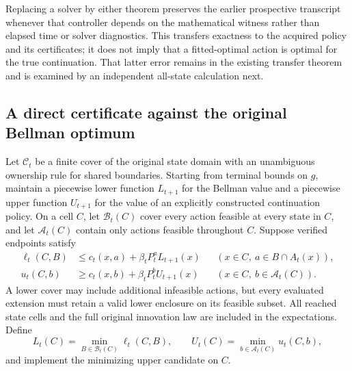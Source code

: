 Replacing a solver by either theorem preserves the earlier prospective transcript whenever that controller depends on the mathematical witness rather than elapsed time or solver diagnostics. This transfers exactness to the acquired policy and its certificates; it does not imply that a fitted-optimal action is optimal for the true continuation. That latter error remains in the existing transfer theorem and is examined by an independent all-state calculation next.

\subsection{A direct certificate against the original Bellman optimum}
Let $\mathcal C_t$ be a finite cover of the original state domain with an unambiguous ownership rule for shared boundaries. Starting from terminal bounds on $g$, maintain a piecewise lower function $L_{t+1}$ for the Bellman value and a piecewise upper function $U_{t+1}$ for the value of an explicitly constructed continuation policy. On a cell $C$, let $\mathcal B_t(C)$ cover every action feasible at every state in $C$, and let $\mathcal A_t(C)$ contain only actions feasible throughout $C$. Suppose verified endpoints satisfy
\begin{align*}
 \ell_t(C,B)&\le c_t(x,a)+\beta_tP_t^a L_{t+1}(x)
      &&(x\in C,\ a\in B\cap A_t(x)),\\
 u_t(C,b)&\ge c_t(x,b)+\beta_tP_t^b U_{t+1}(x)
      &&(x\in C,\ b\in\mathcal A_t(C)).
\end{align*}
A lower cover may include additional infeasible actions, but every evaluated extension must retain a valid lower enclosure on its feasible subset. All reached state cells and the full original innovation law are included in the expectations. Define
\[
 L_t(C)=\min_{B\in\mathcal B_t(C)}\ell_t(C,B),\qquad
 U_t(C)=\min_{b\in\mathcal A_t(C)}u_t(C,b),
\]
and implement the minimizing upper candidate on $C$.

